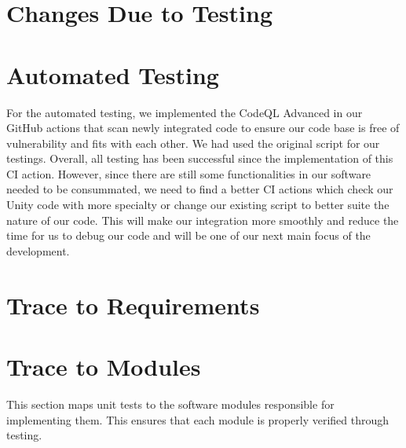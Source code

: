 \documentclass[12pt, titlepage]{article}
\begin{document}
\section{Changes Due to Testing}

\section{Automated Testing}
For the automated testing, we implemented the CodeQL Advanced in our GitHub actions that scan newly integrated code to ensure our code base is free of vulnerability and fits with each other. We had used the original script for our testings. Overall, all testing has been successful since the implementation of this CI action. However, since there are still some functionalities in our software needed to be consummated, we need to find a better CI actions which check our Unity code with more specialty or change our existing script to better suite the nature of our code. This will make our integration more smoothly and reduce the time for us to debug our code and will be one of our next main focus of the development.

\section{Trace to Requirements}

\section{Trace to Modules}
This section maps unit tests to the software modules responsible for implementing them. This ensures that each module is properly verified through testing.
\end{document}
